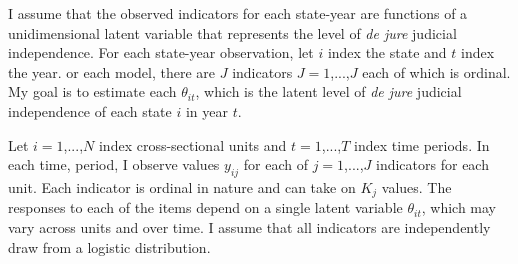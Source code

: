 \documentclass[Johnson MA Draft 2]{subfiles}
\begin{document}
I assume that the observed indicators for each state-year are functions of a unidimensional latent variable that represents the level of \textit{de jure} judicial independence.  For each state-year observation, let $i$ index the state and $t$ index the year.  or each model, there are $J$ indicators $J=1$,...,$J$ each of which is ordinal. My goal is to estimate each $\theta_{it}$, which is the latent level of \textit{de jure} judicial independence of each state $i$ in year $t$.

Let $i=1$,...,$N$ index cross-sectional units and $t=1$,...,$T$ index time periods.  In each time, period, I observe values $y_{ij}$ for each of $j=1$,...,$J$ indicators for each unit.  Each indicator is ordinal in nature and can take on $K_j$ values.  The responses to each of the items depend on a single latent variable $\theta_{it}$, which may vary across units and over time. I assume that all indicators are independently draw from a logistic distribution.  
\end{document}
